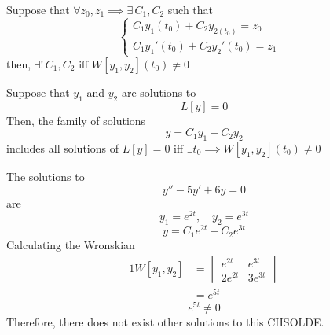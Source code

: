 \documentclass[diffeq.tex]{subfiles}
\begin{document}
    \begin{bproof}
        Suppose that $\forall z_{0}, z_{1} \implies \exists\, C_{1}, C_{2}$ such that
        \begin{equation}
            \begin{cases}
                C_{1}y_{1}(t_{0}) + C_{2}y_{2(t_{0})} = z_{0}&\\
                C_{1}y_{1}'(t_{0}) + C_{2}y_{2}'(t_{0}) = z_{1}&
            \end{cases}
        \end{equation}
        then, $\exists!\,C_{1}, C_{2}$ iff $W[y_{1}, y_{2}](t_{0}) \neq 0$
    \end{bproof}
    \begin{btheorem}
        Suppose that $y_{1}$ and $y_{2}$ are solutions to
        \begin{equation}
            L[y] = 0
        \end{equation}
        Then, the family of solutions
        \begin{equation}
            y=C_{1}y_{1} + C_{2}y_{2}
        \end{equation}
        includes all solutions of $L[y] = 0$ iff $\exists t_{0} \implies W[y_{1}, y_{2}](t_{0}) \neq 0$
    \end{btheorem}
    \np
    \begin{example}[Application of 10.2]
        The solutions to
        \begin{equation}
            y'' - 5y' + 6y = 0
        \end{equation}
        are
        \begin{equation}
            y_{1} = e^{2t},\quad y_{2} = e^{3t}
        \end{equation}
        \begin{equation}
            y = C_{1}e^{2t} + C_{2}e^{3t}
        \end{equation}
        Calculating the Wronskian
        \begin{alignat}{1}
            W[y_{1}, y_{2}] &= \begin{vmatrix}
                e^{2t} & e^{3t}\\
                2e^{2t} & 3e^{3t}
            \end{vmatrix}\\
            &= e^{5t}
        \end{alignat}
        \begin{equation}
            e^{5t} \neq 0
        \end{equation}
        Therefore, there does not exist other solutions to this CHSOLDE.
    \end{example}
\end{document}
